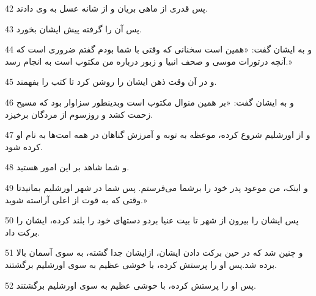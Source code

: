 \par 42 پس قدری از ماهی بریان و از شانه عسل به وی دادند.
\par 43 پس آن را گرفته پیش ایشان بخورد.
\par 44 و به ایشان گفت: «همین است سخنانی که وقتی با شما بودم گفتم ضروری است که آنچه درتورات موسی و صحف انبیا و زبور درباره من مکتوب است به انجام رسد.»
\par 45 و در آن وقت ذهن ایشان را روشن کرد تا کتب را بفهمند.
\par 46 و به ایشان گفت: «بر همین منوال مکتوب است وبدینطور سزاوار بود که مسیح زحمت کشد و روزسوم از مردگان برخیزد.
\par 47 و از اورشلیم شروع کرده، موعظه به توبه و آمرزش گناهان در همه امت‌ها به نام او کرده شود.
\par 48 و شما شاهد بر این امور هستید.
\par 49 و اینک، من موعود پدر خود را برشما می‌فرستم. پس شما در شهر اورشلیم بمانیدتا وقتی که به قوت از اعلی آراسته شوید.»
\par 50 پس ایشان را بیرون از شهر تا بیت عنیا بردو دستهای خود را بلند کرده، ایشان را برکت داد.
\par 51 و چنین شد که در حین برکت دادن ایشان، ازایشان جدا گشته، به سوی آسمان بالا برده شد.پس او را پرستش کرده، با خوشی عظیم به سوی اورشلیم برگشتند.
\par 52 پس او را پرستش کرده، با خوشی عظیم به سوی اورشلیم برگشتند.



